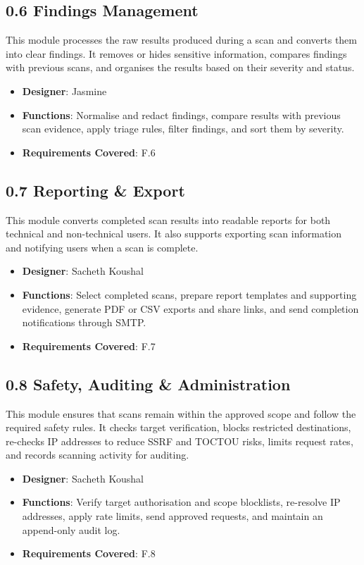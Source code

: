 \documentclass[11pt,a4paper]{article}
\begin{document}
\subsection{0.6 Findings Management}
This module processes the raw results produced during a scan and converts them into clear findings. It removes or hides sensitive information, compares findings with previous scans, and organises the results based on their severity and status.
\begin{itemize}[noitemsep]
    \item \textbf{Designer}: Jasmine
    \item \textbf{Functions}: Normalise and redact findings, compare results with previous scan evidence, apply triage rules, filter findings, and sort them by severity.
    \item \textbf{Requirements Covered}: F.6
\end{itemize}

\subsection{0.7 Reporting \& Export}
This module converts completed scan results into readable reports for both technical and non-technical users. It also supports exporting scan information and notifying users when a scan is complete.
\begin{itemize}[noitemsep]
    \item \textbf{Designer}: Sacheth Koushal
    \item \textbf{Functions}: Select completed scans, prepare report templates and supporting evidence, generate PDF or CSV exports and share links, and send completion notifications through SMTP.
    \item \textbf{Requirements Covered}: F.7
\end{itemize}

\subsection{0.8 Safety, Auditing \& Administration}
This module ensures that scans remain within the approved scope and follow the required safety rules. It checks target verification, blocks restricted destinations, re-checks IP addresses to reduce SSRF and TOCTOU risks, limits request rates, and records scanning activity for auditing.
\begin{itemize}[noitemsep]
    \item \textbf{Designer}: Sacheth Koushal
    \item \textbf{Functions}: Verify target authorisation and scope blocklists, re-resolve IP addresses, apply rate limits, send approved requests, and maintain an append-only audit log.
    \item \textbf{Requirements Covered}: F.8
\end{itemize}
\end{document}
